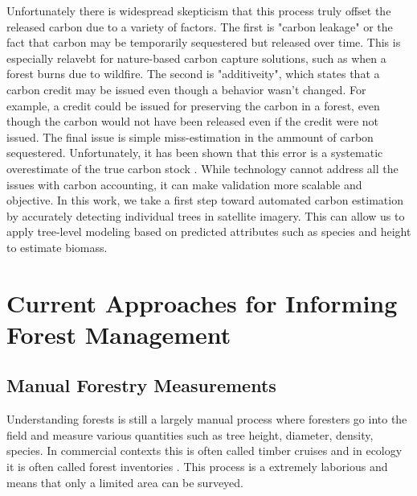 Unfortunately there is widespread skepticism that this process truly offset the released carbon due to a variety of factors. The first is "carbon leakage" or the fact that carbon may be temporarily sequestered but released over time. This is especially relavebt for nature-based carbon capture solutions, such as when a forest burns due to wildfire. The second is "additiveity", which states that a carbon credit may be issued even though a behavior wasn't changed. For example, a credit could be issued for preserving the carbon in a forest, even though the carbon would not have been released even if the credit were not issued. The final issue is simple miss-estimation in the ammount of carbon sequestered. Unfortunately, it has been shown that this error is a systematic overestimate of the true carbon stock \cite{Badgley2022SystematicProgram,West2020OverstatedAmazon}. While technology cannot address all the issues with carbon accounting, it can make validation more scalable and objective. In this work, we take a first step toward automated carbon estimation by accurately detecting individual trees in satellite imagery. This can allow us to apply tree-level modeling based on predicted attributes such as species and height to estimate biomass.    


\section{Current Approaches for Informing Forest Management}
\subsection{Manual Forestry Measurements}
Understanding forests is still a largely manual process where foresters go into the field and measure various quantities such as tree height, diameter, density, species. In commercial contexts this is often called timber cruises \cite{ServiceFSHHANDBOOK} and in ecology it is often called forest inventories \cite{USForestServiceDepartmentofAgriculture2016FORESTPLOTS}. This process is a extremely laborious and means that only a limited area can be surveyed.


